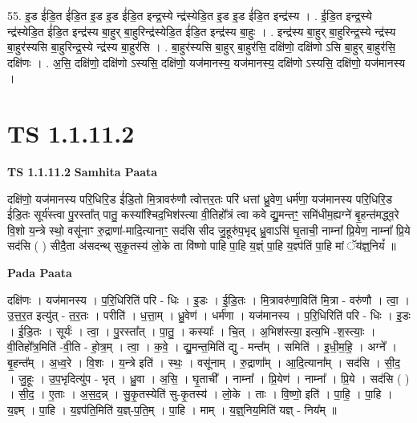 \documentclass[17pt]{extarticle}
\begin{document}
55. इ॒ड ई॑डि॒त ई॑डि॒त इ॒ड इ॒ड ई॑डि॒त इन्द्र॒स्ये न्द्र॑स्येडि॒त इ॒ड इ॒ड ई॑डि॒त इन्द्र॑स्य । . ई॒डि॒त इन्द्र॒स्ये न्द्र॑स्येडि॒त ई॑डि॒त इन्द्र॑स्य बा॒हुर् बा॒हुरिन्द्र॑स्येडि॒त ई॑डि॒त इन्द्र॑स्य बा॒हुः । . इन्द्र॑स्य बा॒हुर् बा॒हुरिन्द्र॒स्ये न्द्र॑स्य बा॒हुर॑स्यसि बा॒हुरिन्द्र॒स्ये न्द्र॑स्य बा॒हुर॑सि । . बा॒हुर॑स्यसि बा॒हुर् बा॒हुर॑सि॒ दक्षि॑णो॒ दक्षि॑णो ऽसि बा॒हुर् बा॒हुर॑सि॒ दक्षि॑णः । . अ॒सि॒ दक्षि॑णो॒ दक्षि॑णो ऽस्यसि॒ दक्षि॑णो॒ यज॑मानस्य॒ यज॑मानस्य॒ दक्षि॑णो ऽस्यसि॒ दक्षि॑णो॒ यज॑मानस्य । \newline
\pagebreak
{}
\section*{ TS 1.1.11.2 }

\textbf{TS 1.1.11.2 } \newline
\textbf{Samhita Paata} \newline

दक्षि॑णो॒ यज॑मानस्य परि॒धिरि॒ड ई॑डि॒तो मि॒त्रावरु॑णौ त्वोत्तर॒तः परि॑ धत्तां ध्रु॒वेण॒ धर्म॑णा॒ यज॑मानस्य परि॒धिरि॒ड ई॑डि॒तः सूर्य॑स्त्वा पु॒रस्ता᳚त् पातु॒ कस्या᳚श्चिद॒भिश॑स्त्या वी॒तिहो᳚त्रं त्वा कवे द्यु॒मन्तꣳ॒॒ समि॑धीम॒ह्यग्ने॑ बृ॒हन्त॑मद्ध्व॒रे वि॒शो य॒न्त्रे स्थो॒ वसू॑नाꣳ रु॒द्राणा॑-मादि॒त्यानाꣳ॒॒ सद॑सि सीद जु॒हूरु॑प॒भृद् ध्रु॒वाऽसि॑ घृ॒ताची॒ नाम्ना᳚ प्रि॒येण॒ नाम्ना᳚ प्रि॒ये सद॑सि ( ) सीदै॒ता अ॑सदन्थ् सुकृ॒तस्य॑ लो॒के ता वि॑ष्णो पाहि पा॒हि य॒ज्ञ्ं पा॒हि य॒ज्ञ्प॑तिं पा॒हि मां ॅय॑ज्ञ्॒नियं᳚ ॥ \newline

\textbf{Pada Paata} \newline

दक्षि॑णः । यज॑मानस्य । प॒रि॒धिरिति॑ परि - धिः । इ॒डः । ई॒डि॒तः । मि॒त्रावरु॑णा॒विति॑ मि॒त्रा - वरु॑णौ । त्वा॒ । उ॒त्त॒र॒त इत्यु॑त् - त॒र॒तः । परीति॑ । ध॒त्ता॒म् । ध्रु॒वेण॑ । धर्म॑णा । यज॑मानस्य । प॒रि॒धिरिति॑ परि - धिः । इ॒डः । ई॒डि॒तः । सूर्यः॑ । त्वा॒ । पु॒रस्ता᳚त् । पा॒तु॒ । कस्याः᳚ । चि॒त् । अ॒भिश॑स्त्या॒ इत्य॒भि -श॒स्त्याः॒ । वी॒तिहो᳚त्र॒मिति॑ -वी॒ति - हो॒त्र॒म् । त्वा॒ । क॒वे॒ । द्यु॒मन्त॒मिति॑ द्यु - मन्त᳚म् । समिति॑ । इ॒धी॒म॒हि॒ । अग्ने᳚ । बृ॒हन्त᳚म् । अ॒ध्व॒रे । वि॒शः । य॒न्त्रे इति॑ । स्थः॒ । वसू॑नाम् । रु॒द्राणा᳚म् । आ॒दि॒त्याना᳚म् । सद॑सि । सी॒द॒ । जु॒हूः । उ॒प॒भृदित्यु॑प - भृत् । ध्रु॒वा । अ॒सि॒ । घृ॒ताची᳚ । नाम्ना᳚ । प्रि॒येण॑ । नाम्ना᳚ । प्रि॒ये । सद॑सि ( ) । सी॒द॒ । ए॒ताः । अ॒स॒द॒न्न् । सु॒कृ॒तस्येति॑ सु-कृ॒तस्य॑ । लो॒के । ताः । वि॒ष्णो॒ इति॑ । पा॒हि॒ । पा॒हि । य॒ज्ञ्म् । पा॒हि । य॒ज्ञ्प॑ति॒मिति॑ य॒ज्ञ्-प॒ति॒म् । पा॒हि । माम् । य॒ज्ञ्॒निय॒मिति॑ यज्ञ् - निय᳚म् ॥  \newline
\end{document}

